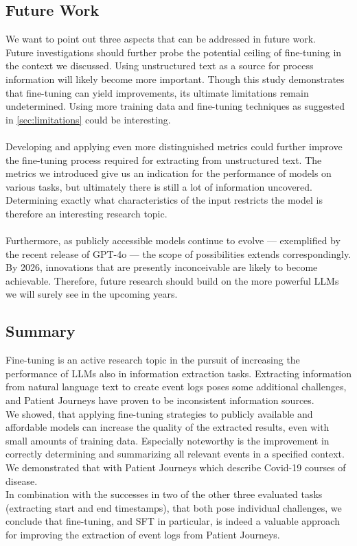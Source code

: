 \subsection{Future Work}\label{sec:future_work}
We want to point out three aspects that can be addressed in future work.\\
Future investigations should further probe the potential ceiling of fine-tuning in the context we discussed. Using unstructured text as a source for process information will likely become more important. Though this study demonstrates that fine-tuning can yield improvements, its ultimate limitations remain undetermined. 
Using more training data and fine-tuning techniques as suggested in \autoref{sec:limitations} could be interesting.\\\\
Developing and applying even more distinguished metrics could further improve the fine-tuning process required for extracting from unstructured text. The metrics we introduced give us an indication for the performance of models on various tasks, but ultimately there is still a lot of information uncovered. Determining exactly what characteristics of the input restricts the model is therefore an interesting research topic.\\\\
Furthermore, as publicly accessible models continue to evolve — exemplified by the recent release of GPT-4o — the scope of possibilities extends correspondingly. By 2026, innovations that are presently inconceivable are likely to become achievable. Therefore, future research should build on the more powerful LLMs we will surely see in the upcoming years.

\subsection{Summary}\label{sec:summary}
Fine-tuning is an active research topic in the pursuit of increasing the performance of LLMs also in information extraction tasks. Extracting information from natural language text to create event logs poses some additional challenges, and Patient Journeys have proven to be inconsistent information sources.\\
We showed, that applying fine-tuning strategies to publicly available and affordable models can increase the quality of the extracted results, even with small amounts of training data. Especially noteworthy is the improvement in correctly determining and summarizing all relevant events in a specified context. We demonstrated that with Patient Journeys which describe Covid-19 courses of disease.\\
In combination with the successes in two of the other three evaluated tasks (extracting start and end timestamps), that both pose individual challenges, we conclude that fine-tuning, and SFT in particular, is indeed a valuable approach for improving the extraction of event logs from Patient Journeys.